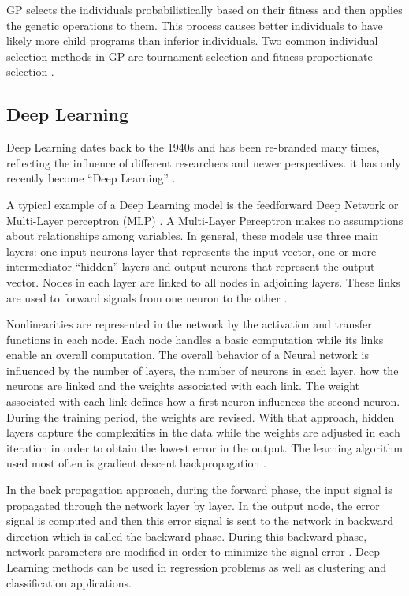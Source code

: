 \documentclass[journal]{IEEEtran}
\begin{document}
GP selects the individuals probabilistically based on their fitness and then applies the genetic operations to them. This process causes better individuals to have likely more child programs than inferior individuals. Two common individual selection methods in GP are tournament selection and fitness proportionate selection \cite{poli2008field}.

\subsection{Deep Learning}

Deep Learning dates back to the 1940s and has been re-branded many times, reflecting the influence of different researchers and newer perspectives. it has only recently become “Deep Learning” \cite{bengio2015deep}.

A typical example of a Deep Learning model is the feedforward Deep Network or Multi-Layer perceptron (MLP) \cite{bengio2015deep}. A Multi-Layer Perceptron makes no assumptions about relationships among variables. In general, these models use three main layers: one input neurons layer that represents the input vector, one or more intermediator “hidden” layers and output neurons that represent the output vector. Nodes in each layer are linked to all nodes in adjoining layers. These links are used to forward signals from one neuron to the other \cite{mushtaq2012empirical} \cite{comrie1997comparing}.

Nonlinearities are represented in the network by the activation and transfer functions in each node. Each node handles a basic computation while its links enable an overall computation. The overall behavior of a Neural network is influenced by the number of layers, the number of neurons in each layer, how the neurons are linked and the weights associated with each link. The weight associated with each link defines how a first neuron influences the second neuron. During the training period, the weights are revised. With that approach, hidden layers capture the complexities in the data while the weights are adjusted in each iteration in order to obtain the lowest error in the output. The learning algorithm used most often is gradient descent backpropagation \cite{mushtaq2012empirical} \cite{bengio2015deep} \cite{comrie1997comparing}.

In the back propagation approach, during the forward phase, the input signal is propagated through the network layer by layer. In the output node, the error signal is computed and then this error signal is sent to the network in backward direction which is called the backward phase. During this backward phase, network parameters are modified in order to minimize the signal error \cite{du2009research}. Deep Learning methods can be used in regression problems as well as clustering and classification applications.
\end{document}
